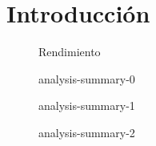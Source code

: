 \chapter{Introducción}
\label{cap:introduction}

\begin{figure}
    \centering
    
    \caption{Rendimiento}
\end{figure}

\begin{figure}
    \centering
    
    \caption{analysis-summary-0}
\end{figure}

\begin{figure}
    \centering
    
    \caption{analysis-summary-1}
\end{figure}

\begin{figure}
    \centering
    
    \caption{analysis-summary-2}
\end{figure}

